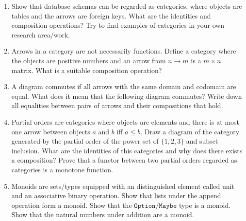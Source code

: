 \documentclass{scrartcl}
\begin{document}
\begin{enumerate}

\item
  Show that database schemas can be regarded as categories, where objects are tables and the arrows are foreign keys.
  What are the identities and composition operations?
  Try to find examples of categories in your own research area/work.

\item \label{ex:matrix}
  Arrows in a category are not necessarily functions.
  Define a category where the objects are positive numbers and an arrow from $n \rightarrow m$ is a $m \times n$ matrix.
  What is a suitable composition operation?

\item
  A diagram commutes if all arrows with the same domain and codomain are equal.
  What does it mean that the following diagram commutes?
  Write down all equalities between pairs of arrows and their compositions that hold.
  \begin{center}
  \end{center}

\item
  Partial orders are categories where objects are elements and there is at most one arrow between objects $a$ and $b$ iff $a \leq b$.
  Draw a diagram of the category generated by the partial order of the power set of $\{1,2,3\}$ and subset inclusion.
  What are the identities of this categories and why does there exists a composition?
  Prove that a functor between two partial orders regarded as categories is a monotone function.

\item
  Monoids are sets/types equipped with an distinguished element called unit and an associative binary operation.
  Show that lists under the append operation form a monoid.
  Show that the $\mathtt{Option}/\mathtt{Maybe}$ type is a monoid.
  Show that the natural numbers under addition are a monoid.


\end{enumerate}
\end{document}
